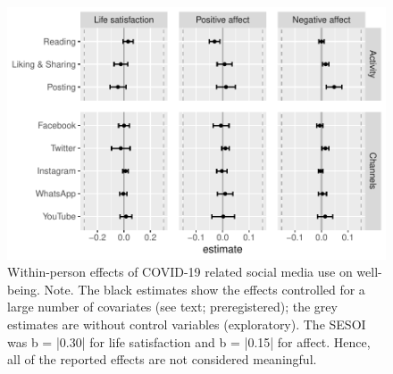\documentclass[
  man,mask,floatsintext]{apa7}
\begin{document}
\begin{figure}
\includegraphics[width=\textwidth]{manuscript_files/figure-latex/fig-within-1} \caption{Within-person effects of COVID-19 related social media use on well-being. Note. The black estimates show the effects controlled for a large number of covariates (see text; preregistered); the grey estimates are without control variables (exploratory). The SESOI was b = |0.30| for life satisfaction and b = |0.15| for affect. Hence, all of the reported effects are not considered meaningful.}\label{fig:fig-within}
\end{figure}
\end{document}
